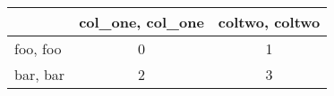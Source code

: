 \begin{tabular}{lcc}
\toprule
 & col\_one, col\_one & coltwo, coltwo \\
\midrule
foo, foo & 0 & 1 \\
bar, bar & 2 & 3 \\
\bottomrule
\end{tabular}
